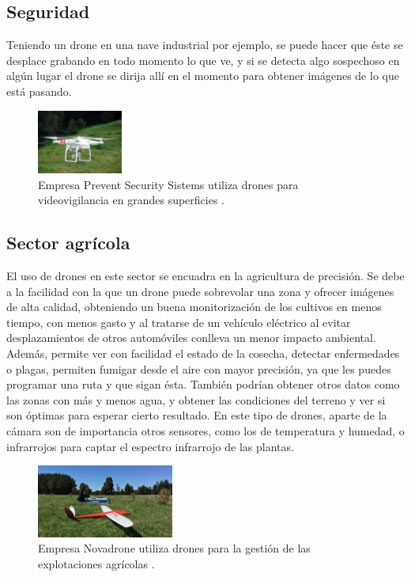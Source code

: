 \subsection{Seguridad} 
\hspace{1 cm}Teniendo un drone en una nave industrial por ejemplo, se puede hacer que \'este se desplace grabando en todo momento lo que ve, y si se detecta algo sospechoso en alg\'un lugar el drone se dirija all\'i en el momento para obtener im\'agenes de lo que est\'a pasando. 

\begin{figure}[H]
	\centering
		\includegraphics[width=0.25\textwidth]{imgs/seguridad_drone.jpg}
		\caption{Empresa Prevent Security Sistems utiliza drones para videovigilancia en grandes superficies .}
	\label{fig: Empresa Prevent Security Sistems realiza videovigilancia con drones.}
\end{figure}

	\subsection{Sector agr\'icola} 
\hspace{1 cm}El uso de drones en este sector se encuadra en la agricultura de precisi\'on. Se debe a la facilidad con la que un drone puede sobrevolar una zona y ofrecer im\'agenes de alta calidad, obteniendo un buena monitorizaci\'on de los cultivos en menos tiempo, con menos gasto y al tratarse de un veh\'iculo el\'ectrico al evitar desplazamientos de otros autom\'oviles conlleva un menor impacto ambiental. Adem\'as, permite ver con facilidad el estado de la cosecha, detectar enfermedades o plagas, permiten fumigar desde el aire con mayor precisi\'on, ya que les puedes programar una ruta y que sigan \'esta. Tambi\'en podr\'ian obtener otros datos como las zonas con m\'as y menos agua, y obtener las condiciones del terreno y ver si son \'optimas para esperar cierto resultado. En este tipo de drones, aparte de la c\'amara son de importancia otros sensores, como los de temperatura y humedad, o infrarrojos para captar el espectro infrarrojo de las plantas. 
	
	
\begin{figure}[H]
	\centering
		\includegraphics[width=0.4\textwidth]{imgs/novadrone.jpg}
		\caption{Empresa Novadrone utiliza drones para la gesti\'on de las explotaciones agr\'icolas .}
	\label{fig: Empresa Novadrone, aplicaciones en agricultura.}
\end{figure}

